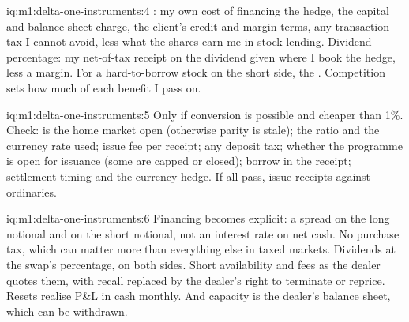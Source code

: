\begin{solution}{iq:m1:delta-one-instruments:4}
: my own cost of financing the hedge, the capital and
balance-sheet charge, the client's credit and margin terms, any transaction
tax I cannot avoid, less what the shares earn me in stock lending.
Dividend percentage: my net-of-tax receipt on the dividend given where I
book the hedge, less a margin. For a hard-to-borrow stock on the short side,
the . Competition sets how much of each benefit I pass on.
\end{solution}

\begin{solution}{iq:m1:delta-one-instruments:5}
Only if conversion is possible and cheaper than 1\%. Check: is the home
market open (otherwise parity is stale); the ratio and the currency rate
used; issue fee per receipt; any deposit tax; whether the programme is open
for issuance (some are capped or closed); borrow in the receipt; settlement
timing and the currency hedge. If all pass, issue receipts against
ordinaries.
\end{solution}

\begin{solution}{iq:m1:delta-one-instruments:6}
Financing becomes explicit: a spread on the long notional and on the short
notional, not an interest rate on net cash. No purchase tax, which can
matter more than everything else in taxed markets. Dividends at the swap's
percentage, on both sides. Short availability and fees as the dealer quotes
them, with recall replaced by the dealer's right to terminate or reprice.
Resets realise P\&L in cash monthly. And capacity is the dealer's balance
sheet, which can be withdrawn.
\end{solution}
